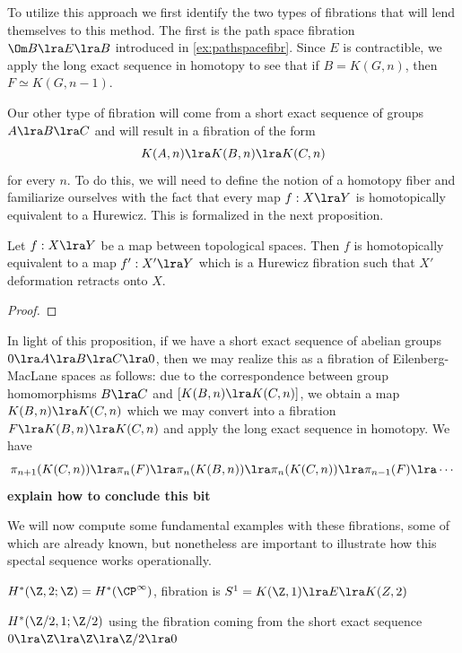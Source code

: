 To utilize this approach we first identify the two types of fibrations that will lend themselves to this method. The first is the path space fibration $\Om B\lra E\lra B$ introduced in \cref{ex:pathspacefibr}. Since $E$ is contractible, we apply the long exact sequence in homotopy to see that if $B=K(G,n)$, then $F\simeq K(G,n-1)$.

Our other type of fibration will come from a short exact sequence of groups $A \lra B\lra C$ and will result in a fibration of the form 
\[
K(A,n)\lra K(B,n)\lra K(C,n)
\]
for every $n$. To do this, we will need to define the notion of a homotopy fiber and familiarize ourselves with the fact that every map $f:X\lra Y$ is homotopically equivalent to a Hurewicz. This is formalized in the next proposition. 

\begin{prop}
    Let $f:X\lra Y$ be a map between topological spaces. Then $f$ is homotopically equivalent to a map $f':X'\lra Y$ which is a Hurewicz fibration such that $X'$ deformation retracts onto $X$. 
\end{prop}
\begin{proof}
    
\end{proof}
In light of this proposition, if we have a short exact sequence of abelian groups $0\lra A\lra B\lra C\lra 0$, then we may realize this as a fibration of Eilenberg-MacLane spaces as follows: due to the correspondence between group homomorphisms $B\lra C$ and $[K(B,n)\lra K(C,n)]$, we obtain a map $K(B,n)\lra K(C,n)$ which we may convert into a fibration $F\lra K(B,n)\lra K(C,n)$ and apply the long exact sequence in homotopy. We have
\[
\pi_{n+1}(K(C,n))\lra \pi_n(F)\lra \pi_n(K(B,n))\lra \pi_n(K(C,n))\lra \pi_{n-1}(F)\lra\cdots
\]
\textbf{explain how to conclude this bit}

We will now compute some fundamental examples with these fibrations, some of which are already known, but nonetheless are important to illustrate how this spectal sequence works operationally. 

\begin{ex}
    $H^*(\Z,2;\Z)=H^*(\CP^{\infty})$, fibration is $S^1=K(\Z,1)\lra E \lra K(Z,2)$
\end{ex}

\begin{ex}
    $H^*(\Z/2,1;\Z/2)$ using the fibration coming from the short exact sequence $0\lra \Z\lra \Z\lra\Z/2\lra 0$
\end{ex}

